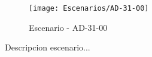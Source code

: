 \begin{figure}[H]
\centering
\texttt{[image: Escenarios/AD-31-00]}
\caption{Escenario - AD-31-00}
\label{fig:AD-31-00}
\end{figure}

Descripcion escenario...
\clearpage
